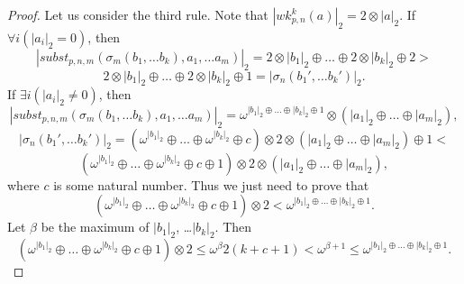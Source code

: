 \documentclass[reqno]{amsart}
\theoremstyle{definition}
\theoremstyle{remark}
\newcommand{\subst}{\mathit{subst}}
\newcommand{\wk}{\mathit{wk}}
\numberwithin{figure}{section}
\begin{document}
\begin{proof}
Let us consider the third rule.
Note that $|\wk^k_{p,n}(a)|_2 = 2 \otimes |a|_2$.
If $\forall i (|a_i|_2 = 0)$, then
\[ |\subst_{p,n,m}(\sigma_m(b_1, \ldots b_k), a_1, \ldots a_m)|_2 = 2 \otimes |b_1|_2 \oplus \ldots \oplus 2 \otimes |b_k|_2 \oplus 2 > \]
\[ 2 \otimes |b_1|_2 \oplus \ldots \oplus 2 \otimes |b_k|_2 \oplus 1 = |\sigma_n(b_1', \ldots b_k')|_2. \]
If $\exists i (|a_i|_2 \neq 0)$, then 
\[ |\subst_{p,n,m}(\sigma_m(b_1, \ldots b_k), a_1, \ldots a_m)|_2 = \omega^{|b_1|_2 \oplus \ldots \oplus |b_k|_2 \oplus 1} \otimes (|a_1|_2 \oplus \ldots \oplus |a_m|_2), \]
\[ |\sigma_n(b_1', \ldots b_k')|_2 = (\omega^{|b_1|_2} \oplus \ldots \oplus \omega^{|b_k|_2} \oplus c) \otimes 2 \otimes (|a_1|_2 \oplus \ldots \oplus |a_m|_2) \oplus 1 < \]
\[ (\omega^{|b_1|_2} \oplus \ldots \oplus \omega^{|b_k|_2} \oplus c \oplus 1) \otimes 2 \otimes (|a_1|_2 \oplus \ldots \oplus |a_m|_2), \]
where $c$ is some natural number.
Thus we just need to prove that
\[ (\omega^{|b_1|_2} \oplus \ldots \oplus \omega^{|b_k|_2} \oplus c \oplus 1) \otimes 2 < \omega^{|b_1|_2 \oplus \ldots \oplus |b_k|_2 \oplus 1}. \]
Let $\beta$ be the maximum of $|b_1|_2$, \ldots $|b_k|_2$.
Then
\[ (\omega^{|b_1|_2} \oplus \ldots \oplus \omega^{|b_k|_2} \oplus c \oplus 1) \otimes 2 \leq \omega^\beta 2 (k + c + 1) < \omega^{\beta + 1} \leq \omega^{|b_1|_2 \oplus \ldots \oplus |b_k|_2 \oplus 1}. \]


\end{proof}
\end{document}
